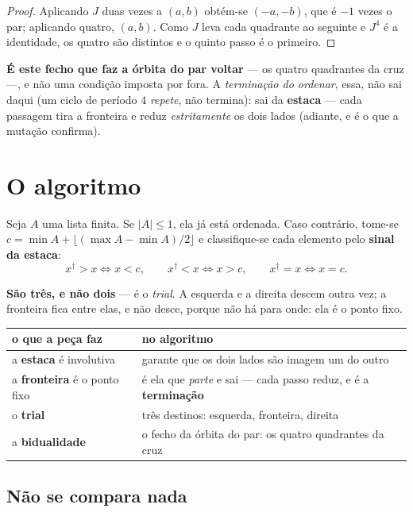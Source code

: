 \documentclass[11pt,a4paper]{article}
\begin{document}
\begin{proof}
Aplicando $J$ duas vezes a $(a,b)$ obtém-se $(-a,-b)$, que é $-1$ vezes o par; aplicando quatro,
$(a,b)$. Como $J$ leva cada quadrante ao seguinte e $J^{4}$ é a identidade, os quatro são
distintos e o quinto passo é o primeiro. \end{proof}

\noindent \textbf{É este fecho que faz a órbita do par voltar} --- os quatro quadrantes da cruz ---, e
não uma condição imposta por fora. A \emph{terminação do ordenar}, essa, não sai daqui (um ciclo de
período $4$ \emph{repete}, não termina): sai da \textbf{estaca} --- cada passagem tira a fronteira e
reduz \emph{estritamente} os dois lados (adiante, e é o que a mutação confirma).

\section{O algoritmo}

Seja $A$ uma lista finita. Se $|A|\leq 1$, ela já está ordenada. Caso contrário, tome-se
$c=\min A+\lfloor(\max A-\min A)/2\rfloor$ e classifique-se cada elemento pelo \textbf{sinal da
estaca}:
\[
  x^{\dagger}>x \iff x<c, \qquad
  x^{\dagger}<x \iff x>c, \qquad
  x^{\dagger}=x \iff x=c .
\]

\noindent \textbf{São três, e não dois} --- é o \emph{trial}. A esquerda e a direita descem outra
vez; a fronteira fica entre elas, e não desce, porque não há para onde: ela é o ponto fixo.

\begin{center}\small
\begin{tabular}{@{}ll@{}}
\toprule
o que a peça faz & no algoritmo \\
\midrule
a \textbf{estaca} é involutiva & garante que os dois lados são imagem um do outro \\
a \textbf{fronteira} é o ponto fixo & é ela que \emph{parte} e sai --- cada passo reduz, e é a \textbf{terminação} \\
o \textbf{trial} & três destinos: esquerda, fronteira, direita \\
a \textbf{bidualidade} & o fecho da órbita do par: os quatro quadrantes da cruz \\
\bottomrule
\end{tabular}
\end{center}

\subsection*{Não se compara nada}
\end{document}
